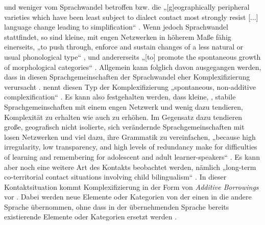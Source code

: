 und  weniger vom Sprachwandel betroffen bzw. die „[g]eographically peripheral varieties which have been least subject to dialect contact most strongly resist [...] language change leading to simplification“ \citep[6]{Trudgill1996}. Wenn jedoch Sprachwandel stattfindet, so sind kleine,  mit engen Netzwerken in höherem Maße fähig einerseits, „to push through, enforce and sustain changes of a less natural or usual phonological type“ \citep[11]{Trudgill1996}, und andererseits „[to] promote the spontaneous growth of morphological categories“ \citep[109]{Trudgill2009}. Allgemein kann folglich davon ausgegangen werden, dass in diesen Sprachgemeinschaften der Sprachwandel eher Komplexifizierung verursacht \citep[103]{Trudgill2011}. \citet{Trudgill2011} nennt diesen Typ der Komplexifizierung „spontaneous, non-additive complexification“ \citep[71]{Trudgill2011}. Es kann also festgehalten werden, dass kleine, , stabile Sprachgemeinschaften mit einem engen Netzwerk und wenig  dazu tendieren, Komplexität zu erhalten wie auch zu erhöhen. Im Gegensatz dazu tendieren große, geografisch nicht isolierte, sich verändernde Sprachgemeinschaften mit losen Netzwerken und viel  dazu, ihre Grammatik zu vereinfachen, „because high irregularity, low transparency, and high levels of redundancy make for difficulties of learning and remembering for adolescent and adult learner-speakers“ \citep[101]{Trudgill2009}. Es kann aber noch eine weitere Art des Kontakts beobachtet werden, nämlich „long-term co-territorial contact situations involving child bilingualism“ \citep[34]{Trudgill2011}. In dieser Kontaktsituation kommt Komplexifizierung in der Form von \textit{Additive Borrowings} vor \citep[27]{Trudgill2011}. Dabei werden neue Elemente oder Kategorien von der einen in die andere Sprache übernommen, ohne dass in der übernehmenden Sprache bereits existierende Elemente oder Kategorien ersetzt werden \citep[27]{Trudgill2011}.

